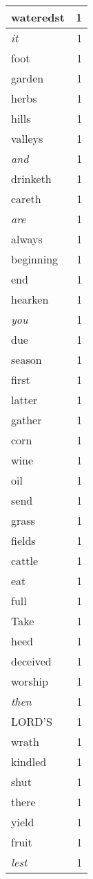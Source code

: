 \begin{center}
\begin{longtable}{l|r}
wateredst & 1 \\ \hline
\emph{it} & 1 \\ \hline
foot & 1 \\ \hline
garden & 1 \\ \hline
herbs & 1 \\ \hline
hills & 1 \\ \hline
valleys & 1 \\ \hline
\emph{and} & 1 \\ \hline
drinketh & 1 \\ \hline
careth & 1 \\ \hline
\emph{are} & 1 \\ \hline
always & 1 \\ \hline
beginning & 1 \\ \hline
end & 1 \\ \hline
hearken & 1 \\ \hline
\emph{you} & 1 \\ \hline
due & 1 \\ \hline
season & 1 \\ \hline
first & 1 \\ \hline
latter & 1 \\ \hline
gather & 1 \\ \hline
corn & 1 \\ \hline
wine & 1 \\ \hline
oil & 1 \\ \hline
send & 1 \\ \hline
grass & 1 \\ \hline
fields & 1 \\ \hline
cattle & 1 \\ \hline
eat & 1 \\ \hline
full & 1 \\ \hline
Take & 1 \\ \hline
heed & 1 \\ \hline
deceived & 1 \\ \hline
worship & 1 \\ \hline
\emph{then} & 1 \\ \hline
LORD'S & 1 \\ \hline
wrath & 1 \\ \hline
kindled & 1 \\ \hline
shut & 1 \\ \hline
there & 1 \\ \hline
yield & 1 \\ \hline
fruit & 1 \\ \hline
\emph{lest} & 1 \\ \hline

\end{longtable}
\end{center}
